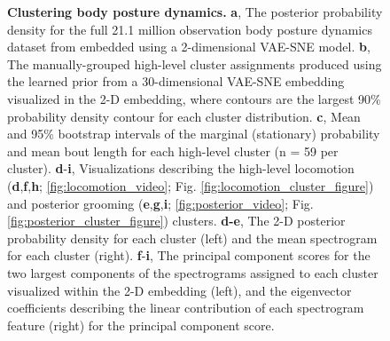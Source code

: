 \documentclass[11pt,a4paper,oneside]{book}
\begin{document}
\begin{doublespace}
\begin{figure}[!htb]
\caption{  \textbf{Clustering body posture dynamics.} \textbf{a}, The posterior probability density for the full 21.1 million observation body posture dynamics dataset from \cite{berman2014mapping, berman2016predictability, pereira2019fast} embedded using a 2-dimensional VAE-SNE model. \textbf{b}, The manually-grouped high-level cluster assignments produced using the learned prior from a 30-dimensional VAE-SNE embedding visualized in the 2-D embedding, where contours are the largest 90\% probability density contour for each cluster distribution. \textbf{c}, Mean and 95\% bootstrap intervals of the marginal (stationary) probability and mean bout length for each high-level cluster (n = 59 per cluster). \textbf{d}-\textbf{i}, Visualizations describing the high-level locomotion (\textbf{d},\textbf{f},\textbf{h}; \ref{fig:locomotion_video}; Fig. \ref{fig:locomotion_cluster_figure}) and posterior grooming (\textbf{e},\textbf{g},\textbf{i}; \ref{fig:posterior_video}; Fig. \ref{fig:posterior_cluster_figure}) clusters. \textbf{d-e}, The 2-D posterior probability density for each cluster (left) and the mean spectrogram for each cluster (right). \textbf{f}-\textbf{i}, The principal component scores for the two largest components of the spectrograms assigned to each cluster visualized within the 2-D embedding (left), and the eigenvector coefficients describing the linear contribution of each spectrogram feature (right) for the principal component score.}
\label{fig:cluster_figure}
\end{figure}



\end{doublespace}
\end{document}
